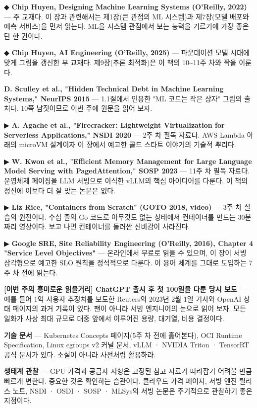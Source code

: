\begin{tbbitemize}
  \item ◆ \textbf{Chip Huyen, Designing Machine Learning Systems (O'Reilly, 2022)} — 주 교재다. 이 장과 관련해서는 제1장(큰 관점의 ML 시스템)과 제7장(모델 배포와 예측 서비스)을 먼저 읽는다. ML을 시스템 관점에서 보는 능력을 기르기에 가장 좋은 단 한 권이다.
  \item ◆ \textbf{Chip Huyen, AI Engineering (O'Reilly, 2025)} — 파운데이션 모델 시대에 맞게 그림을 갱신한 부 교재다. 제9장(추론 최적화)은 이 책의 10\textasciitilde{}11주 차와 짝을 이룬다.
  \item \textbf{D. Sculley et al., "Hidden Technical Debt in Machine Learning Systems," NeurIPS 2015} — 1.1절에서 인용한 "ML 코드는 작은 상자" 그림의 출처다. 10쪽 남짓이므로 이번 주에 원문을 읽어 보자.
  \item ▶ \textbf{A. Agache et al., "Firecracker: Lightweight Virtualization for Serverless Applications," NSDI 2020} — 2주 차 필독 자료다. AWS Lambda 아래의 microVM 설계이자 이 장에서 예고한 콜드 스타트 이야기의 기술적 뿌리다.
  \item ▶ \textbf{W. Kwon et al., "Efficient Memory Management for Large Language Model Serving with PagedAttention," SOSP 2023} — 11주 차 필독 자료다. 운영체제 페이징을 LLM 서빙으로 이식한 vLLM의 핵심 아이디어를 다룬다. 이 책의 정신에 이보다 더 잘 맞는 논문은 없다.
  \item ▶ \textbf{Liz Rice, "Containers from Scratch" (GOTO 2018, video)} — 3주 차 실습의 원전이다. 수십 줄의 Go 코드로 아무것도 없는 상태에서 컨테이너를 만드는 30분짜리 영상이다. 보고 나면 컨테이너를 둘러싼 신비감이 사라진다.
  \item ▶ \textbf{Google SRE, Site Reliability Engineering (O'Reilly, 2016), Chapter 4 "Service Level Objectives"} — 온라인에서 무료로 읽을 수 있으며, 이 장이 서빙 삼각형으로 예고한 SLO 원칙을 정석적으로 다룬다. 이 용어 체계를 그대로 도입하는 7주 차 전에 읽는다.
  \item \textbf{[이번 주의 흥미로운 읽을거리] ChatGPT 출시 후 첫 100일을 다룬 당시 보도} — 예를 들어 1억 사용자 추정치를 보도한 Reuters의 2023년 2월 1일 기사와 OpenAI 상태 페이지의 과거 기록이 있다. 팬이 아니라 서빙 엔지니어의 눈으로 읽어 보자. 모든 일화가 사상 최대 규모로 대중 앞에서 이루어진 용량, 대기열, 비용 결정이다.
  \item \textbf{기술 문서} — Kubernetes Concepts 페이지(5주 차 전에 훑어본다), OCI Runtime Specification, Linux cgroups v2 커널 문서, vLLM · NVIDIA Triton · TensorRT 공식 문서가 있다. 소설이 아니라 사전처럼 활용하라.
  \item \textbf{생태계 관찰} — GPU 가격과 공급자 지형은 고정된 참고 자료가 따라잡기 어려울 만큼 빠르게 변한다. 중요한 것은 확인하는 습관이다. 클라우드 가격 페이지, 서빙 엔진 릴리스 노트, NSDI · OSDI · SOSP · MLSys의 서빙 논문은 주기적으로 관찰하기 좋은 지점이다.
\end{tbbitemize}

